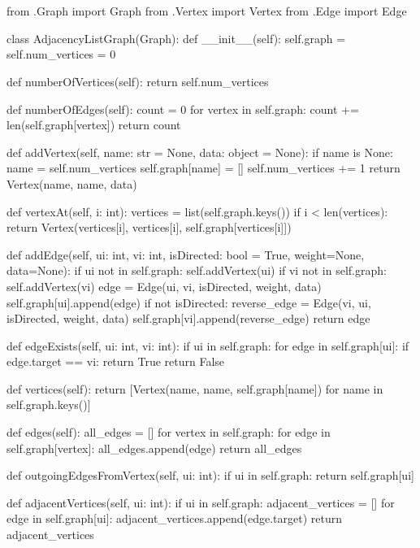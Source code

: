 \documentclass{article}
\begin{document}
\section{} %
\begin{python}
from .Graph import Graph
from .Vertex import Vertex
from .Edge import Edge



class AdjacencyListGraph(Graph):
    def __init__(self):
        self.graph = {}
        self.num_vertices = 0

    def numberOfVertices(self):
        return self.num_vertices

    def numberOfEdges(self):
        count = 0
        for vertex in self.graph:
            count += len(self.graph[vertex])
        return count

    def addVertex(self, name: str = None, data: object = None):
        if name is None:
            name = self.num_vertices
        self.graph[name] = []
        self.num_vertices += 1
        return Vertex(name, name, data)

    def vertexAt(self, i: int):
        vertices = list(self.graph.keys())
        if i < len(vertices):
            return Vertex(vertices[i], vertices[i], self.graph[vertices[i]])

    def addEdge(self, ui: int, vi: int, isDirected: bool = True, weight=None, data=None):
        if ui not in self.graph:
            self.addVertex(ui)
        if vi not in self.graph:
            self.addVertex(vi)
        edge = Edge(ui, vi, isDirected, weight, data)
        self.graph[ui].append(edge)
        if not isDirected:
            reverse_edge = Edge(vi, ui, isDirected, weight, data)
            self.graph[vi].append(reverse_edge)
        return edge

    def edgeExists(self, ui: int, vi: int):
        if ui in self.graph:
            for edge in self.graph[ui]:
                if edge.target == vi:
                    return True
        return False

    def vertices(self):
        return [Vertex(name, name, self.graph[name]) for name in self.graph.keys()]

    def edges(self):
        all_edges = []
        for vertex in self.graph:
            for edge in self.graph[vertex]:
                all_edges.append(edge)
        return all_edges

    def outgoingEdgesFromVertex(self, ui: int):
        if ui in self.graph:
            return self.graph[ui]

    def adjacentVertices(self, ui: int):
        if ui in self.graph:
            adjacent_vertices = []
            for edge in self.graph[ui]:
                adjacent_vertices.append(edge.target)
            return adjacent_vertices
\end{python}
\end{document}
